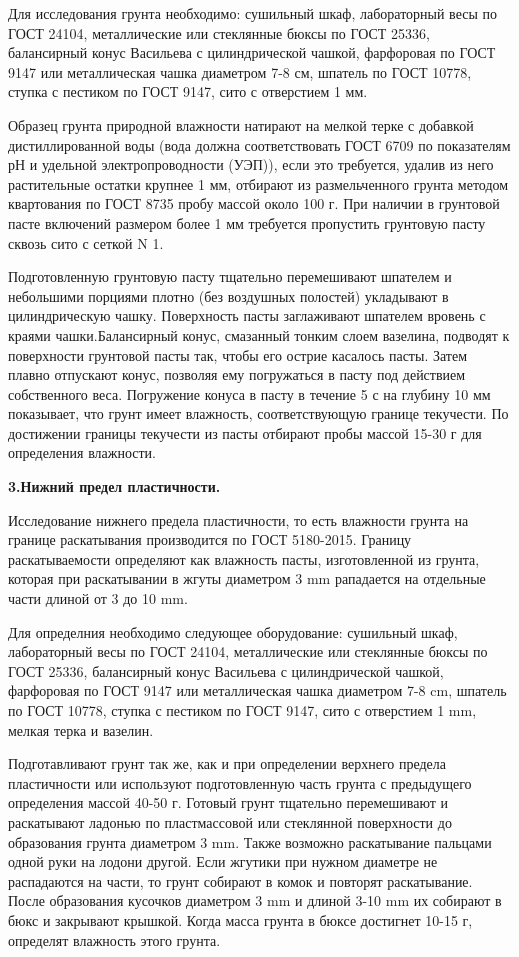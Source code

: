 Для исследования грунта необходимо: сушильный шкаф, лабораторный весы по ГОСТ 24104, 
металлические или стеклянные бюксы по ГОСТ 25336, балансирный конус Васильева с цилиндрической 
чашкой, фарфоровая по ГОСТ 9147 или металлическая чашка диаметром 7-8 см, шпатель по ГОСТ 10778,
ступка с пестиком по ГОСТ 9147, сито с отверстием 1 мм.

Образец грунта природной влажности натирают на мелкой терке с добавкой дистиллированной воды 
(вода должна соответствовать ГОСТ 6709 по показателям рН и удельной
электропроводности (УЭП)), если это требуется, удалив из него растительные
остатки крупнее 1 мм, отбирают из размельченного грунта методом
квартования по ГОСТ 8735 пробу массой около 100 г. При наличии в грунтовой
пасте включений размером более 1 мм требуется пропустить грунтовую пасту
сквозь сито с сеткой N 1.

Подготовленную грунтовую пасту тщательно перемешивают шпателем
и небольшими порциями плотно (без воздушных полостей) укладывают в
цилиндрическую чашку. Поверхность пасты заглаживают шпателем вровень с
краями чашки.Балансирный конус, смазанный тонким слоем вазелина, подводят к
поверхности грунтовой пасты так, чтобы его острие касалось пасты. Затем
плавно отпускают конус, позволяя ему погружаться в пасту под действием
собственного веса. Погружение конуса в пасту в течение 5 с на глубину 10 мм показывает,
что грунт имеет влажность, соответствующую границе текучести. По достижении границы текучести 
из пасты отбирают пробы массой 15-30 г для определения влажности.

\textbf{3.Нижний предел пластичности.}

Исследование нижнего предела пластичности, то есть влажности грунта на границе раскатывания 
производится по ГОСТ 5180-2015. Границу раскатываемости определяют как влажность пасты, 
изготовленной из грунта, которая при раскатывании  в жгуты диаметром 3 \si{\milli\meter} 
рападается на отдельные части длиной от 3 до 10 \si{\milli\meter}.

Для определния необходимо следующее оборудование: сушильный шкаф, лабораторный весы по ГОСТ 24104, 
металлические или стеклянные бюксы по ГОСТ 25336, балансирный конус Васильева с цилиндрической 
чашкой, фарфоровая по ГОСТ 9147 или металлическая чашка диаметром 7-8 \si{\centi\meter}, шпатель по ГОСТ 10778,
ступка с пестиком по ГОСТ 9147, сито с отверстием 1 \si{\milli\meter}, мелкая терка и вазелин.

Подготавливают грунт так же, как и при определении верхнего предела пластичности или используют 
подготовленную часть грунта с предыдущего определения массой 40-50 г.
Готовый грунт тщательно перемешивают и раскатывают ладонью по пластмассовой или стеклянной поверхности 
до образования грунта диаметром 3 \si{\milli\meter}. Также возможно раскатывание пальцами одной руки 
на лодони другой. Если жгутики при нужном диаметре не распадаются на части, то грунт собирают 
в комок и повторят раскатывание. После образования кусочков диаметром 3 \si{\milli\meter} и длиной 3-10
\si{\milli\meter} их собирают в бюкс и закрывают крышкой. Когда масса грунта в бюксе достигнет 10-15 г, 
определят влажность этого грунта.

